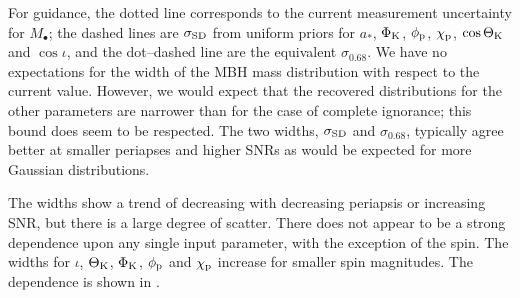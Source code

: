 For guidance, the dotted line corresponds to the current measurement uncertainty for $M_\bullet$; the dashed lines are $\sigma_\mathrm{SD}$ from uniform priors for $a_\ast$, $\Phi_\mathrm{K}$, $\phi_\mathrm{p}$, $\chi_\mathrm{p}$, $\cos\Theta_\mathrm{K}$ and $\cos\iota$, and the dot--dashed line are the equivalent $\sigma_{0.68}$. We have no expectations for the width of the MBH mass distribution with respect to the current value. However, we would expect that the recovered distributions for the other parameters are narrower than for the case of complete ignorance; this bound does seem to be respected. The two widths, $\sigma_\mathrm{SD}$ and $\sigma_{0.68}$, typically agree better at smaller periapses and higher SNRs as would be expected for more Gaussian distributions.

The widths show a trend of decreasing with decreasing periapsis or increasing SNR, but there is a large degree of scatter. There does not appear to be a strong dependence upon any single input parameter, with the exception of the spin. The widths for $\iota$, $\Theta_\mathrm{K}$, $\Phi_\mathrm{K}$, $\phi_\mathrm{p}$ and $\chi_\mathrm{p}$ increase for smaller spin magnitudes. The dependence is shown in .
